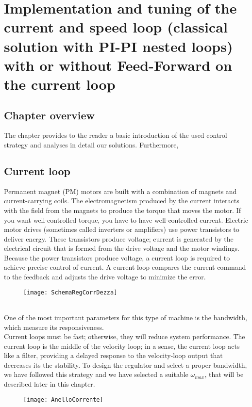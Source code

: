 \documentclass[12pt]{article}
\begin{document}
\newpage\section{Implementation and tuning of the current and speed loop (classical solution with PI-PI nested loops) with or without Feed-Forward on the current loop}
\subsection{Chapter overview}
The chapter provides to the reader a basic introduction of the used control strategy and analyses in detail our solutions.
Furthermore, 
\subsection{Current loop}
Permanent magnet (PM) motors
are built with a combination of magnets and current-carrying coils. The electromagnetism
produced by the current interacts with the field from the magnets to produce
the torque that moves the motor. If you want well-controlled torque, you have to have
well-controlled current.
Electric motor drives (sometimes called inverters or amplifiers) use power transistors to
deliver energy. These transistors produce voltage; current is generated by the electrical
circuit that is formed from the drive voltage and the motor windings.
Because the power transistors produce voltage, a current loop is required to achieve
precise control of current. A current loop compares the current command to the feedback
and adjusts the drive voltage to minimize the error.
\begin{figure}[h]
\centering
\texttt{[image: SchemaRegCorrDezza]}
\end{figure}\\[0.5cm]
One of the most important parameters for this type of machine is the bandwidth, which measure its responsiveness.\\ 
Current loops must be fast; otherwise, they will reduce system performance. The current
loop is the middle of the velocity loop; in a sense, the current loop acts like a filter,
providing a delayed response to the velocity-loop output that decreases its the stability. 
To design the regulator and select a proper bandwidth, we have followed this strategy and we have selected a suitable \textit{$\omega_{max}$}, that will be described later in this chapter.
\begin{figure}[h]
\centering
\texttt{[image: AnelloCorrente]}
\end{figure}\\
\end{document}
